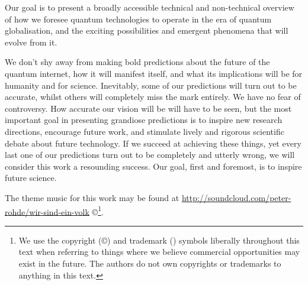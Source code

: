 Our goal is to present a broadly accessible technical and non-technical overview of how we foresee quantum technologies to operate in the era of quantum globalisation, and the exciting possibilities and emergent phenomena that will evolve from it.

We don't shy away from making bold predictions about the future of the quantum internet, how it will manifest itself, and what its implications will be for humanity and for science. Inevitably, some of our predictions will turn out to be accurate, whilst others will completely miss the mark entirely. We have no fear of controversy. How accurate our vision will be will have to be seen, but the most important goal in presenting grandiose predictions is to inspire new research directions, encourage future work, and stimulate lively and rigorous scientific debate about future technology. If we succeed at achieving these things, yet every last one of our predictions turn out to be completely and utterly wrong, we will consider this work a resounding success. Our goal, first and foremost, is to inspire future science.

The theme music for this work may be found at \href{http://soundcloud.com/peter-rohde/wir-sind-ein-volk}{http://soundcloud.com/peter-rohde/wir-sind-ein-volk} \copyright{}\footnote{We use the copyright (\copyright) and trademark (\texttrademark) symbols liberally throughout this text when referring to things where we believe commercial opportunities may exist in the future. The authors do not own copyrights or trademarks to anything in this text.}.